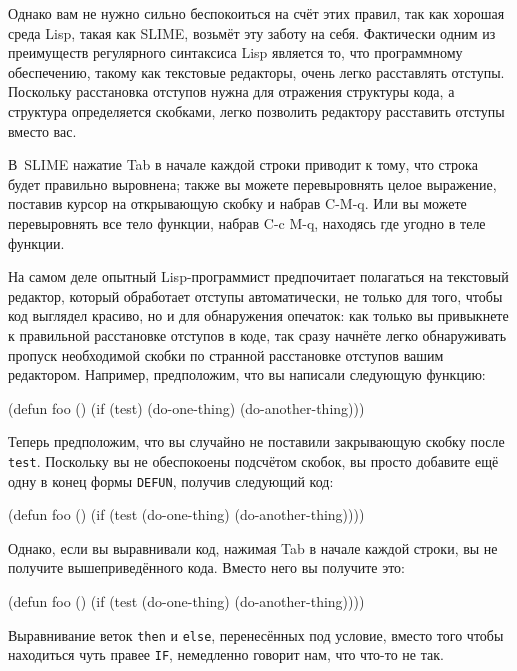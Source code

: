 Однако вам не нужно сильно беспокоиться на счёт этих правил, так как хорошая среда Lisp,
такая как SLIME, возьмёт эту заботу на себя. Фактически одним из преимуществ регулярного
синтаксиса Lisp является то, что программному обеспечению, такому как текстовые редакторы,
очень легко расставлять отступы. Поскольку расстановка отступов нужна для отражения
структуры кода, а структура определяется скобками, легко позволить редактору расставить
отступы вместо вас.

В~SLIME нажатие Tab в начале каждой строки приводит к тому, что строка будет правильно
выровнена; также вы можете перевыровнять целое выражение, поставив курсор на открывающую
скобку и набрав C-M-q. Или вы можете перевыровнять все тело функции, набрав C-c M-q,
находясь где угодно в теле функции.

На самом деле опытный Lisp-программист предпочитает полагаться на текстовый редактор,
который обработает отступы автоматически, не только для того, чтобы код выглядел красиво,
но и для обнаружения опечаток: как только вы привыкнете к правильной расстановке отступов
в коде, так сразу начнёте легко обнаруживать пропуск необходимой скобки по странной
расстановке отступов вашим редактором. Например, предположим, что вы написали следующую
функцию:

\begin{myverb}
(defun foo ()
  (if (test)
    (do-one-thing)
    (do-another-thing)))
\end{myverb}

Теперь предположим, что вы случайно не поставили закрывающую скобку после
\lstinline{test}. Поскольку вы не обеспокоены подсчётом скобок, вы просто добавите ещё одну в
конец формы \lstinline{DEFUN}, получив следующий код:

\begin{myverb}
(defun foo ()
  (if (test
    (do-one-thing)
    (do-another-thing))))
\end{myverb}

Однако, если вы выравнивали код, нажимая Tab в начале каждой строки, вы не получите
вышеприведённого кода. Вместо него вы получите это:

\begin{myverb}
(defun foo ()
  (if (test
       (do-one-thing)
       (do-another-thing))))
\end{myverb}

Выравнивание веток \lstinline{then} и \lstinline{else}, перенесённых под условие, вместо того чтобы
находиться чуть правее \lstinline{IF}, немедленно говорит нам, что что-то не так.

